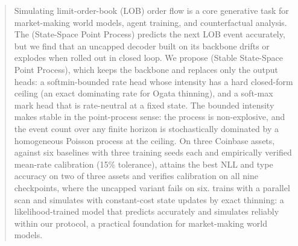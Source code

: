 \begin{abstract}
Simulating limit-order-book (LOB) order flow is a core generative task for
market-making world models, agent training, and counterfactual analysis.
The \sppp{} (State-Space Point Process) predicts the next LOB event
accurately, but we find that an uncapped decoder built on its backbone
drifts or explodes when rolled out in closed loop. We propose \ssppp{}
(Stable State-Space Point Process), which keeps the backbone and replaces
only the output heads: a softmin-bounded rate head whose intensity has a
hard closed-form ceiling (an exact dominating rate for Ogata thinning), and
a soft-max mark head that is rate-neutral at a fixed state. The bounded
intensity makes \ssppp{} stable in the point-process sense: the process is
non-explosive, and the event count over any finite horizon is
stochastically dominated by a homogeneous Poisson process at the ceiling. On three Coinbase assets,
against six baselines with three training seeds each and empirically
verified mean-rate calibration (15\% tolerance), \ssppp{} attains the best
NLL and type accuracy on two of three assets and verifies calibration on
all nine checkpoints, where the uncapped variant fails on six. \ssppp{}
trains with a parallel scan and simulates with constant-cost state updates
by exact thinning: a likelihood-trained model that predicts accurately and
simulates reliably within our protocol, a practical foundation for
market-making world models.
\end{abstract}
